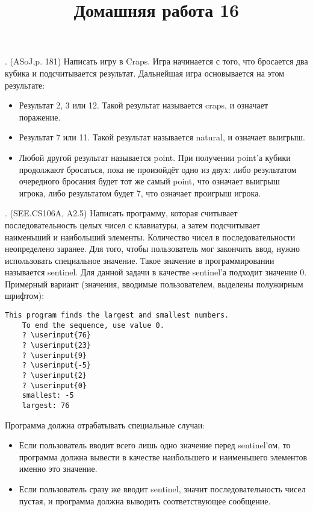 \documentclass[a4paper,12pt,draft]{article}
\title{Домашняя работа 16}
\date{}
\newcommand\userinput[1]{\textbf{#1}}
\newcounter{problemnumber}
\newenvironment{problem}[1]
	{\addtocounter{problemnumber}{1}\arabic{problemnumber}. (#1)}
	{\vspace{6pt}}
\begin{document}
\maketitle{}

\begin{problem}{ASoJ,p. 181}
    Написать игру в Craps. Игра начинается с того, что бросается два кубика и
    подсчитывается результат. Дальнейшая игра основывается на этом результате:

    \begin{itemize}
        \item{Результат 2, 3 или 12. Такой результат называется craps, и
                означает поражение.}
        \item{Результат 7 или 11. Такой результат называется natural, и
                означает выигрыш.}
        \item{Любой другой результат называется point. При получении point'а
                кубики продолжают бросаться, пока не произойдёт одно из двух:
                либо результатом очередного бросания будет тот же самый  point,
                что означает выигрыш игрока, либо результатом будет 7, что
                означает проигрыш игрока.}
    \end{itemize}
\end{problem}

\begin{problem}{SEE.CS106A, A2.5}
    Написать программу, которая считывает последовательность целых чисел с
    клавиатуры, а затем подсчитывает наименьший и наибольший элементы.
    Количество чисел в последовательности неопределено заранее. Для того,
    чтобы пользователь мог закончить ввод, нужно использовать специальное
    значение. Такое значение в программировании называется sentinel. Для
    данной задачи в качестве sentinel'а подходит значение 0.
    Примерный вариант (значения, вводимые пользователем, выделены полужирным
    шрифтом):

    \begin{Verbatim}[commandchars=\\\{\}]
    This program finds the largest and smallest numbers.
    To end the sequence, use value 0.
    ? \userinput{76}
    ? \userinput{23}
    ? \userinput{9}
    ? \userinput{-5}
    ? \userinput{2}
    ? \userinput{0}
    smallest: -5
    largest: 76
    \end{Verbatim}

    Программа должна отрабатывать специальные случаи:

    \begin{itemize}
        \item{Если пользователь вводит всего лишь одно значение перед
                sentinel'ом, то программа должна вывести в качестве
                наибольшего и наименьшего элементов именно это значение.}
        \item{Если пользователь сразу же вводит sentinel, значит
                последовательность чисел пустая, и программа должна выводить
                соответствующее сообщение.}
    \end{itemize}
    
\end{problem}
\end{document}
